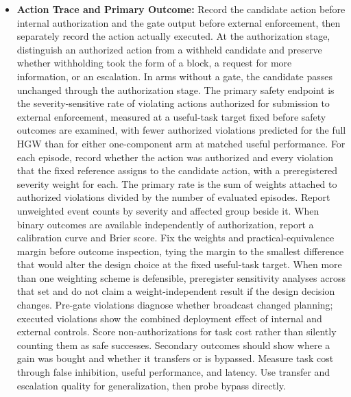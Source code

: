 \documentclass{article}
\begin{document}
\begin{itemize}
    \item \textbf{Action Trace and Primary Outcome:} Record the candidate action before internal authorization and the gate output before external enforcement, then separately record the action actually executed. At the authorization stage, distinguish an authorized action from a withheld candidate and preserve whether withholding took the form of a block, a request for more information, or an escalation. In arms without a gate, the candidate passes unchanged through the authorization stage. The primary safety endpoint is the severity-sensitive rate of violating actions authorized for submission to external enforcement, measured at a useful-task target fixed before safety outcomes are examined, with fewer authorized violations predicted for the full HGW than for either one-component arm at matched useful performance. For each episode, record whether the action was authorized and every violation that the fixed reference assigns to the candidate action, with a preregistered severity weight for each. The primary rate is the sum of weights attached to authorized violations divided by the number of evaluated episodes. Report unweighted event counts by severity and affected group beside it. When binary outcomes are available independently of authorization, report a calibration curve and Brier score. Fix the weights and practical-equivalence margin before outcome inspection, tying the margin to the smallest difference that would alter the design choice at the fixed useful-task target. When more than one weighting scheme is defensible, preregister sensitivity analyses across that set and do not claim a weight-independent result if the design decision changes. Pre-gate violations diagnose whether broadcast changed planning; executed violations show the combined deployment effect of internal and external controls. Score non-authorizations for task cost rather than silently counting them as safe successes. Secondary outcomes should show where a gain was bought and whether it transfers or is bypassed. Measure task cost through false inhibition, useful performance, and latency. Use transfer and escalation quality for generalization, then probe bypass directly.

\end{itemize}
\end{document}
